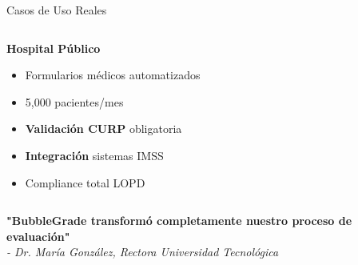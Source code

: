 \documentclass[aspectratio=169,11pt]{beamer}
\begin{document}
\begin{frame}{Casos de Uso Reales}
\begin{columns}
\begin{column}{0.5\textwidth}
            \vspace{0.5cm}
            \textbf{\textcolor{jazzpurple}{Hospital Público}}
            \begin{itemize}
                \item Formularios médicos automatizados
                \item 5,000 pacientes/mes
                \item \textbf{Validación CURP} obligatoria
                \item \textbf{Integración} sistemas IMSS
                \item Compliance total LOPD
            \end{itemize}
        \end{column}
    \end{columns}
    
    \vspace{0.5cm}
    \begin{center}
        \large \textcolor{jazzblue}{\textbf{"BubbleGrade transformó completamente nuestro proceso de evaluación"}}\\
        \textit{- Dr. María González, Rectora Universidad Tecnológica}
    \end{center}
\end{frame}
\end{document}
